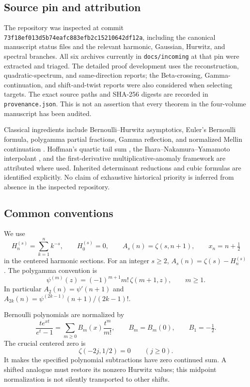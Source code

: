 \documentclass[11pt,a4paper]{article}
\numberwithin{equation}{section}
\theoremstyle{plain}
\theoremstyle{definition}
\theoremstyle{remark}
\newcommand{\src}[1]{\nolinkurl{#1}}
\newcommand{\sourcepin}{\texttt{73f18ef013d5b74eafc883efb2c15210642df12a}}
\begin{document}
\subsection{Source pin and attribution}

The repository was inspected at commit \sourcepin, including the
canonical manuscript status files and the relevant harmonic, Gaussian,
Hurwitz, and spectral branches.  All six archives currently in
\src{docs/incoming} at that pin were extracted and triaged.  The detailed
proof development uses the reconstruction, quadratic-spectrum, and
same-direction reports; the Beta-crossing, Gamma-continuation, and
shift-and-twist reports were also considered when selecting targets.
The exact source paths and SHA-256 digests are recorded in
\src{provenance.json}.  This is not an assertion that every theorem in
the four-volume manuscript has been audited.

Classical ingredients include Bernoulli--Hurwitz asymptotics, Euler's
Bernoulli formula, polygamma partial fractions, Gamma reflection, and
normalized Mellin continuation \cite{DLMF}.  Hoffman's quartic tail
sum \cite{Hoffman}, the Ihara--Nakamura--Yamamoto interpolant
\cite{INY}, and the first-derivative multiplicative-anomaly framework
\cite{EVZ,PolynomialAnomaly} are attributed where used.  Inherited
determinant reductions and cubic formulas are identified explicitly.
No claim of exhaustive historical priority is inferred from absence in
the inspected repository.

\subsection{Common conventions}

We use
\[
 H_n^{(s)}=\sum_{k=1}^n k^{-s},\qquad H_0^{(s)}=0,\qquad
 A_s(n)=\zeta(s,n+1),\qquad x_n=n+\tfrac12
\]
in the centered harmonic sections.  For an integer $s\ge2$,
$A_s(n)=\zeta(s)-H_n^{(s)}$.  The polygamma convention is
\[
 \psi^{(m)}(z)=(-1)^{m+1}m!\,\zeta(m+1,z),\qquad m\ge1.
\]
In particular $A_2(n)=\psi'(n+1)$ and
$A_{2k}(n)=\psi^{(2k-1)}(n+1)/(2k-1)!$.

Bernoulli polynomials are normalized by
\[
 \frac{te^{xt}}{e^t-1}=\sum_{m\ge0}B_m(x)\frac{t^m}{m!},
 \qquad B_m=B_m(0),\qquad B_1=-\tfrac12.
\]
The crucial centered zero is
\[
 \zeta(-2j,1/2)=0\qquad(j\ge0).
\]
It makes the specified polynomial subtractions have zero continued
sum.  A shifted analogue must restore its nonzero Hurwitz values;
this midpoint normalization is not silently transported to other shifts.
\end{document}
